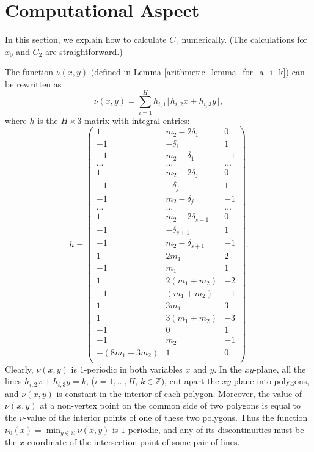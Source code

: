 \documentclass[11pt]{amsart}
\numberwithin{equation}{section}
\begin{document}
\section{Computational Aspect}\label{Computation_Section}
In this section, we explain how to calculate $C_1$ numerically. (The calculations for $x_0$ and $C_2$ are straightforward.)

The function $\nu(x,y)$ (defined in Lemma \ref{arithmetic_lemma_for_a_i_k}) can be rewritten as
\[ \nu(x,y) = \sum_{i=1}^{H}  h_{i,1}\lfloor h_{i,2}x+h_{i,3}y \rfloor , \]
where $h$ is the $H \times 3$ matrix with integral entries:
\[h = \left(\begin{array}{rrr}
	1 & m_2 - 2\delta_{1} & 0 \\
	-1 & -\delta_{1} & 1 \\
	-1 & m_2-\delta_{1} & -1\\
	 \ldots&\ldots&\ldots\\
	 1 & m_2 - 2\delta_{j} & 0 \\
	 -1 & -\delta_{j} & 1 \\
	 -1 & m_2-\delta_{j} & -1\\
	 \ldots&\ldots&\ldots\\
    1 & m_2 - 2\delta_{s+1} & 0 \\
	-1 & -\delta_{s+1} & 1 \\
	-1 & m_2-\delta_{s+1} & -1\\
	 1 & 2m_{1} & 2\\
	 -1 & m_{1} & 1\\
	1 & 2(m_1+m_2) & -2\\
	-1 & (m_1+m_2) & -1\\
	1 & 3m_{1} & 3\\
	1 & 3(m_1+m_2) & -3\\
	-1 & 0 & 1\\
	-1 & m_{2} & -1\\
	-(8m_1 + 3m_2)&1 &0\\
\end{array}\right).
\]
Clearly, $\nu(x,y)$ is $1$-periodic in both variables $x$ and $y$. In the $xy$-plane, all the lines $h_{i,2}x + h_{i,3}y = k$, ($i=1,\ldots,H$, $k \in \mathbb{Z}$), cut apart the $xy$-plane into polygons, and $\nu(x,y)$ is constant in the interior of each polygon. Moreover, the value of $\nu(x,y)$ at a non-vertex point on the common side of two polygons is equal to the $\nu$-value of the interior points of one of these two polygons. Thus the function $\nu_0(x)=\min_{y \in \mathbb{R}} \nu(x,y)$ is $1$-periodic, and any of its discontinuities must be the $x$-coordinate of the intersection point of some pair of lines.
\end{document}
